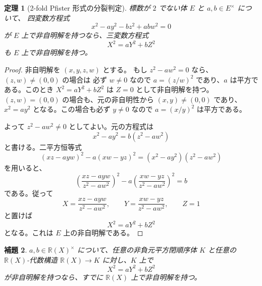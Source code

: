 \documentclass[uplatex,dvipdfmx]{jsarticle}
\newcommand{\Frac}{\mathbb{R}(X)}
\theoremstyle{matrixsosdefinition}
\newtheorem{theorem}{定理}
\newtheorem{lemma}[theorem]{補題}
\begin{document}
\begin{theorem}[2-fold Pfister 形式の分裂判定]
  標数が \(2\) でない体 \(E\) と \(a,b\in E^\times\) について、
  四変数方程式
\[
  x^2-a y^2-b z^2+ab w^2=0
\]
が \(E\) 上で非自明解を持つなら、三変数方程式
\[
  X^2=aY^2+bZ^2
\]
も \(E\) 上で非自明解を持つ。
\end{theorem}

\begin{proof}
  非自明解を \((x,y,z,w)\) とする。
  もし \(z^2-a w^2=0\) なら、\((z,w)\ne(0,0)\) の場合は
  必ず \(w\ne0\) なので \(a=(z/w)^2\) であり、\(a\) は平方である。このとき
  \(X^2=aY^2+bZ^2\) は \(Z=0\) として非自明解を持つ。
  \((z,w)=(0,0)\) の場合も、元の非自明性から \((x,y)\ne(0,0)\) であり、
  \(x^2=a y^2\) となる。この場合も必ず \(y\ne0\) なので
  \(a=(x/y)^2\) は平方である。

  よって \(z^2-a w^2\ne0\) としてよい。元の方程式は
  \[
    x^2-a y^2=b(z^2-a w^2)
  \]
  と書ける。二平方恒等式
  \[
    (xz-a y w)^2-a(xw-yz)^2
    =(x^2-a y^2)(z^2-a w^2)
  \]
  を用いると、
  \[
    \left(\frac{xz-a y w}{z^2-a w^2}\right)^2
    -
    a\left(\frac{xw-yz}{z^2-a w^2}\right)^2
    =b
  \]
  である。従って
  \[
    X=\frac{xz-a y w}{z^2-a w^2},\qquad
    Y=\frac{xw-yz}{z^2-a w^2},\qquad
    Z=1
  \]
  と置けば
  \[
    X^2=aY^2+bZ^2
  \]
  となる。これは \(E\) 上の非自明解である。
\end{proof}

\begin{lemma}\label{lem:ternary-local-global}
  \(a,b\in\Frac^\times\) について、任意の非負元平方閉順序体 \(K\) と任意の
  \(\Frac\)-代数構造 \(\Frac\to K\) に対し、\(K\) 上で
  \[
    X^2=aY^2+bZ^2
  \]
  が非自明解を持つなら、すでに \(\Frac\) 上で非自明解を持つ。
\end{lemma}
\end{document}
